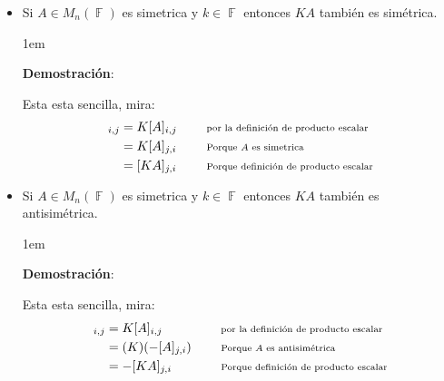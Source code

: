 \documentclass[12pt, fleqn]{report}                             %
\newenvironment{SmallIndentation}[1][0.75em]                    %
        {\begin{adjustwidth}{#1}{}\begin{footnotesize}}             %
        {\end{footnotesize}\end{adjustwidth}}                       %
\DeclareMathOperator \Space {\quad}                             %
\newcommand \Remember[1]{\Space\text{\scriptsize{#1}}}          %
\theoremstyle{break}                                            %
\DeclareMathOperator \GenericField {\mathbb{F}}                 %
\begin{document}
\begin{itemize}
\begin{SmallIndentation}[1em]
                            \end{SmallIndentation}

                        \item Si $A \in M_{n}(\GenericField)$ es simetrica y $k \in \GenericField$ entonces 
                            $KA$ también es simétrica.

                            \begin{SmallIndentation}[1em]
                                \textbf{Demostración}:

                                Esta esta sencilla, mira:
                                \begin{align*}
                                    [KA]_{i, j}
                                        &= K [A]_{i, j}     
                                            && \Remember{por la definición de producto escalar} \\
                                        &= K [A]_{j, i}
                                            && \Remember{Porque $A$ es simetrica}               \\
                                        &= [KA]_{j, i}
                                            && \Remember{Porque definición de producto escalar}
                                \end{align*}

                            \end{SmallIndentation}

                        \item Si $A \in M_{n}(\GenericField)$ es simetrica y $k \in \GenericField$ entonces 
                            $KA$ también es antisimétrica.

                            \begin{SmallIndentation}[1em]
                                \textbf{Demostración}:

                                Esta esta sencilla, mira:
                                \begin{align*}
                                    [KA]_{i, j}
                                        &= K [A]_{i, j}     
                                            && \Remember{por la definición de producto escalar} \\
                                        &= (K)(-[A]_{j, i})
                                            && \Remember{Porque $A$ es antisimétrica}           \\
                                        &= -[KA]_{j, i}
                                            && \Remember{Porque definición de producto escalar}
                                \end{align*}


\end{SmallIndentation}
\end{itemize}
\end{document}
